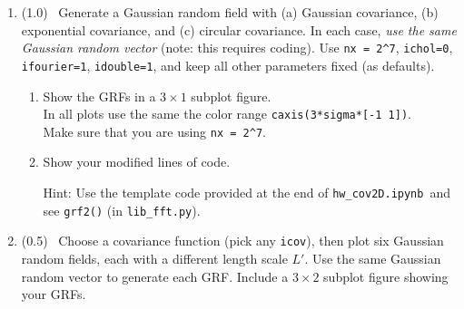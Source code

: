 \documentclass[11pt,titlepage,fleqn]{article}
\newcommand{\tfile}{{\tt hw\_cov2D.ipynb}}
\begin{document}
\begin{enumerate}
\item (1.0) \ptag\ Generate a Gaussian random field with (a) Gaussian covariance, (b) exponential covariance, and (c) circular covariance. In each case, {\em use the same Gaussian random vector} (note: this requires coding). Use \verb+nx = 2^7+, \verb+ichol=0+, \verb+ifourier=1+, \verb+idouble=1+, and keep all other parameters fixed (as defaults).
%
\begin{enumerate}
\item Show the GRFs in a $3 \times 1$ subplot figure. \\
In all plots use the same the color range \verb+caxis(3*sigma*[-1 1])+. \\
Make sure that you are using \verb+nx = 2^7+.

\item Show your modified lines of code.

Hint: Use the template code provided at the end of \tfile\ and see \verb+grf2()+ (in \verb+lib_fft.py+).
\end{enumerate}

\item (0.5) \ptag\ Choose a covariance function (pick any \verb+icov+), then plot six Gaussian random fields, each with a different length scale $L'$. Use the same Gaussian random vector to generate each GRF. Include a $3 \times 2$ subplot figure showing your GRFs.

\end{enumerate}







\end{document}
